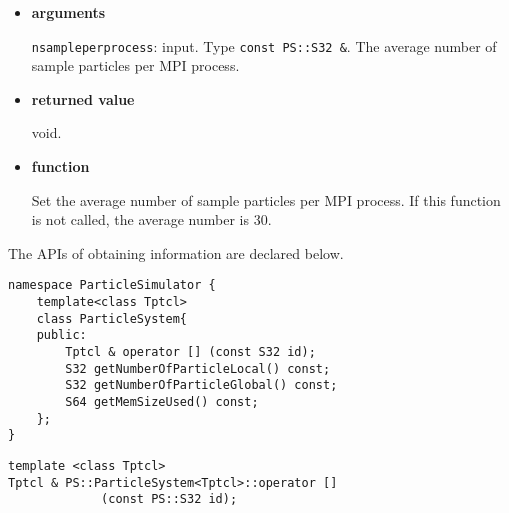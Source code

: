 \begin{itemize}

\item {\bf arguments}

{\tt nsampleperprocess}: input. Type {\tt const PS::S32 \&}. The
average number of sample particles per MPI process.


\item {\bf returned value}

void.

\item {\bf function}

Set the average number of sample particles per MPI process. If this
function is not called, the average number is 30.


\end{itemize}



The APIs of obtaining information are declared below.

\begin{lstlisting}[caption=ParticleSystem2]
namespace ParticleSimulator {
    template<class Tptcl>
    class ParticleSystem{
    public:
        Tptcl & operator [] (const S32 id);
        S32 getNumberOfParticleLocal() const;
        S32 getNumberOfParticleGlobal() const;
        S64 getMemSizeUsed() const;
    };
}
\end{lstlisting}


\begin{screen}
\begin{verbatim}
template <class Tptcl>
Tptcl & PS::ParticleSystem<Tptcl>::operator []
             (const PS::S32 id);
\end{verbatim}
\end{screen}

